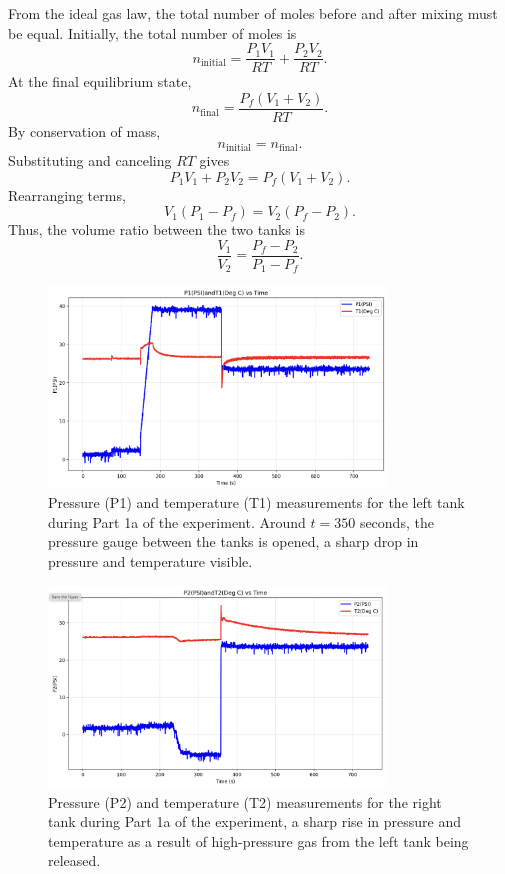 \documentclass[12pt]{article}
\begin{document}
From the ideal gas law, the total number of moles before and after mixing must be equal. Initially, the total number of moles is
\[
n_{\text{initial}} = \frac{P_1 V_1}{R T} + \frac{P_2 V_2}{R T}.
\]
At the final equilibrium state,
\[
n_{\text{final}} = \frac{P_f (V_1 + V_2)}{R T}.
\]
By conservation of mass,
\[
n_{\text{initial}} = n_{\text{final}}.
\]
Substituting and canceling $R T$ gives
\[
P_1 V_1 + P_2 V_2 = P_f (V_1 + V_2).
\]
Rearranging terms,
\[
V_1 (P_1 - P_f) = V_2 (P_f - P_2).
\]
Thus, the volume ratio between the two tanks is
\[
\boxed{\frac{V_1}{V_2} = \frac{P_f - P_2}{P_1 - P_f}}.
\]


\begin{figure}[h!]
\centering
\includegraphics[width=0.8\textwidth]{1a-left_tank.png}
\caption{Pressure (P1) and temperature (T1) measurements for the left tank during Part 1a of the experiment. Around $t = 350$ seconds, the pressure gauge between the tanks is opened, a sharp drop in pressure and temperature visible.}
\label{fig:tank1_data_a}
\end{figure}

\begin{figure}[h!]
\centering
\includegraphics[width=0.8\textwidth]{1a-right_tank.png}
\caption{Pressure (P2) and temperature (T2) measurements for the right tank during Part 1a of the experiment, a sharp rise in pressure and temperature as a result of high-pressure gas from the left tank being released.}
\label{fig:tank2_data_a}
\end{figure}
\end{document}
